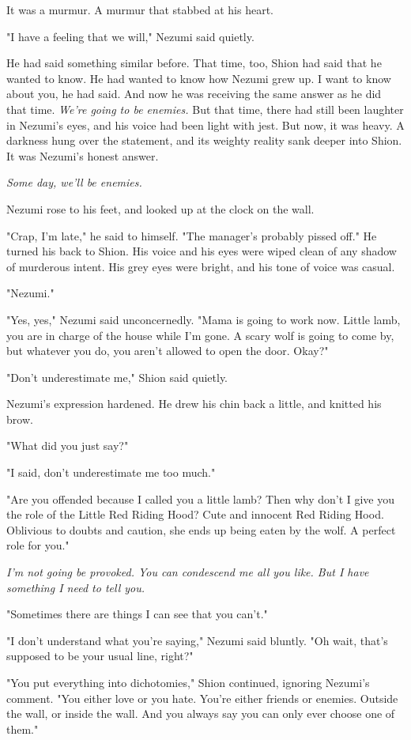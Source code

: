 It was a murmur. A murmur that stabbed at his heart.

"I have a feeling that we will," Nezumi said quietly.

He had said something similar before. That time, too, Shion had said
that he wanted to know. He had wanted to know how Nezumi grew up. I want
to know about you, he had said. And now he was receiving the same answer
as he did that time. \emph{We're going to be enemies.} But that time, there had
still been laughter in Nezumi's eyes, and his voice had been light with
jest. But now, it was heavy. A darkness hung over the statement, and its
weighty reality sank deeper into Shion. It was Nezumi's honest answer.

\emph{Some day, we'll be enemies.}

Nezumi rose to his feet, and looked up at the clock on the wall.

"Crap, I'm late," he said to himself. "The manager's probably pissed
off." He turned his back to Shion. His voice and his eyes were wiped
clean of any shadow of murderous intent. His grey eyes were bright, and
his tone of voice was casual.

"Nezumi."

"Yes, yes," Nezumi said unconcernedly. "Mama is going to work now.
Little lamb, you are in charge of the house while I'm gone. A scary wolf
is going to come by, but whatever you do, you aren't allowed to open the
door. Okay?"

"Don't underestimate me," Shion said quietly.

Nezumi's expression hardened. He drew his chin back a little, and
knitted his brow.

"What did you just say?"

"I said, don't underestimate me too much."

"Are you offended because I called you a little lamb? Then why don't I
give you the role of the Little Red Riding Hood? Cute and innocent Red
Riding Hood. Oblivious to doubts and caution, she ends up being eaten by
the wolf. A perfect role for you."

\emph{I'm not going be provoked. You can condescend me all you like. But I
	have something I need to tell you.}

"Sometimes there are things I can see that you can't."

"I don't understand what you're saying," Nezumi said bluntly. "Oh wait,
that's supposed to be your usual line, right?"

"You put everything into dichotomies," Shion continued, ignoring
Nezumi's comment. "You either love or you hate. You're either friends or
enemies. Outside the wall, or inside the wall. And you always say you
can only ever choose one of them."

